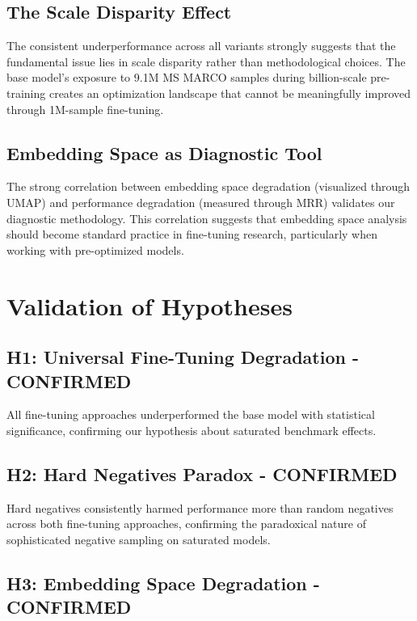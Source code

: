 \subsection{The Scale Disparity Effect}

The consistent underperformance across all variants strongly suggests that the fundamental issue lies in scale disparity rather than methodological choices. The base model's exposure to 9.1M MS MARCO samples during billion-scale pre-training creates an optimization landscape that cannot be meaningfully improved through 1M-sample fine-tuning.

\subsection{Embedding Space as Diagnostic Tool}

The strong correlation between embedding space degradation (visualized through UMAP) and performance degradation (measured through MRR) validates our diagnostic methodology. This correlation suggests that embedding space analysis should become standard practice in fine-tuning research, particularly when working with pre-optimized models.

\section{Validation of Hypotheses}

\subsection{H1: Universal Fine-Tuning Degradation - CONFIRMED}

All fine-tuning approaches underperformed the base model with statistical significance, confirming our hypothesis about saturated benchmark effects.

\subsection{H2: Hard Negatives Paradox - CONFIRMED}

Hard negatives consistently harmed performance more than random negatives across both fine-tuning approaches, confirming the paradoxical nature of sophisticated negative sampling on saturated models.

\subsection{H3: Embedding Space Degradation - CONFIRMED}

